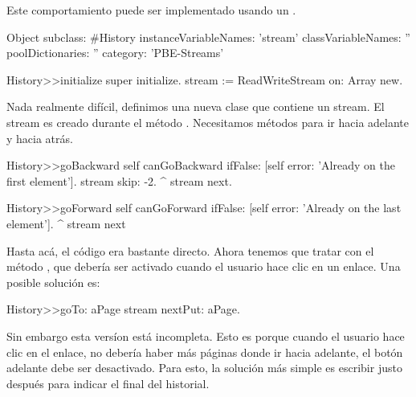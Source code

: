 \documentclass[a4paper,10pt,twoside]{book}
\begin{document}
{%
\noindent Este comportamiento puede ser implementado usando un .


\begin{code}{}
Object subclass: #History
  instanceVariableNames: 'stream'
  classVariableNames: ''
  poolDictionaries: ''
  category: 'PBE-Streams'

History>>initialize
    super initialize.
    stream := ReadWriteStream on: Array new.
\end{code}

Nada realmente dif\'icil, definimos una nueva clase que contiene un stream. El stream es creado durante el m\'etodo .
Necesitamos m\'etodos para ir hacia adelante y hacia atr\'as.

\begin{code}{}
History>>goBackward
  self canGoBackward ifFalse: [self error: 'Already on the first element'].
  stream skip: -2.
  ^ stream next.

History>>goForward
  self canGoForward ifFalse: [self error: 'Already on the last element'].
  ^ stream next
\end{code}

Hasta ac\'a, el c\'odigo era bastante directo. Ahora tenemos que tratar con el m\'etodo , que deber\'ia 
ser activado cuando el usuario hace clic en un enlace. Una posible soluci\'on es:

\begin{code}{}
History>>goTo: aPage
    stream nextPut: aPage.
\end{code}

Sin embargo esta vers\'ion est\'a incompleta. Esto es porque cuando el usuario
hace clic en el enlace, no deber\'ia haber m\'as p\'aginas donde ir hacia adelante, 
\ie el bot\'on adelante debe ser desactivado. Para esto, la soluci\'on m\'as simple
es escribir  justo despu\'es para indicar el final del historial.

}
\end{document}
